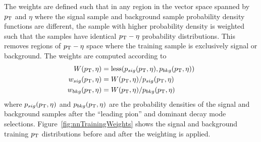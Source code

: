 The weights are defined such that in any region in the vector space spanned by
$p_{\mathrm{T}}$ and $\eta$ where the signal sample and background sample probability
density functions are different, the sample with higher probability density is
weighted such that the samples have identical $p_{\mathrm{T}}-\eta$ probability
distributions.  This removes regions of $p_{\mathrm{T}}-\eta$ space where the training
sample is exclusively signal or background.  The weights are computed according to
\begin{align*}
   W(p_{\mathrm{T}}, \eta) &=  {\rm less}(p_{sig}(p_{\mathrm{T}}, \eta), p_{bkg}(p_{\mathrm{T}}, \eta))\\
   w_{sig}(p_{\mathrm{T}}, \eta) &=  W(p_{\mathrm{T}}, \eta)/p_{sig}(p_{\mathrm{T}}, \eta) \\
   w_{bkg}(p_{\mathrm{T}}, \eta) &=  W(p_{\mathrm{T}}, \eta)/p_{bkg}(p_{\mathrm{T}}, \eta) 
\end{align*}
where \mbox{$p_{sig}(p_{\mathrm{T}},\eta)$} and \mbox{$p_{bkg}(p_{\mathrm{T}},\eta)$} are the probability densities of
the signal and background samples after the ``leading pion'' and dominant decay mode
selections. Figure~\ref{fig:nnTrainingWeights} shows the signal and background
training $p_{\mathrm{T}}$ distributions before and after the weighting is applied.


